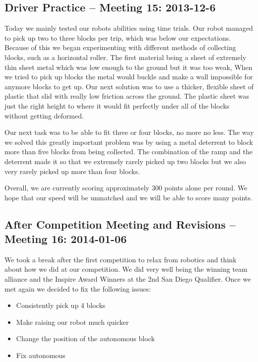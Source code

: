 \newpage \subsection{Driver Practice -- Meeting 15: 2013-12-6}
Today we mainly tested our robots abilities using time trials.  Our robot managed to pick up two to three blocks per trip, which was below our expectations.  Because of this we began experimenting with different methods of collecting blocks, such as a horizontal roller. The first material being a sheet of extremely thin sheet metal which was low enough to the ground but it was too weak, When we tried to pick up blocks the metal would buckle and make a wall impossible for anymore blocks to get up.  Our next solution was to use a thicker, flexible sheet of plastic that slid with really low friction across the ground.  The plastic sheet was just the right height to where it would fit perfectly under all of the blocks without getting deformed. 

Our next task was to be able to fit three or four blocks, no more no less.  The way we solved this greatly important problem was by using a metal deterrent to block more than five blocks from being collected.  The combination of the ramp and the deterrent made it so that we extremely rarely picked up two blocks but we also very rarely picked up more than four blocks.

Overall, we are currently scoring approximately 300 points alone per round. We hope that our speed will be unmatched and we will be able to score many points. 
\newpage \subsection{After Competition Meeting and Revisions -- Meeting 16: 2014-01-06}
We took a break after the first competition to relax from robotics and think about how we did at our competition. We did very well being the winning team alliance and the Inspire Award Winners at the 2nd San Diego Qualifier. Once we met again we decided to fix the following issues: 

\begin{itemize}
\item Consistently pick up 4 blocks
\item Make raising our robot much quicker
\item Change the position of the autonomous block
\item Fix autonomous
\end{itemize}

